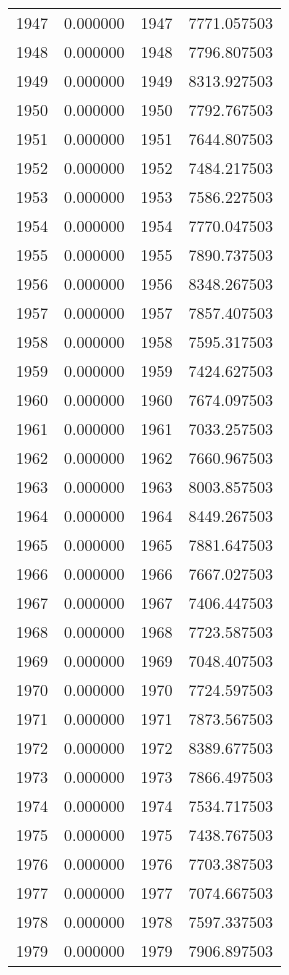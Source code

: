 \documentclass[12pt]{article}
\begin{document}
\begin{longtable}{@{}cccc@{}}
1947 & 0.000000 & 1947 & 7771.057503 \\
1948 & 0.000000 & 1948 & 7796.807503 \\
1949 & 0.000000 & 1949 & 8313.927503 \\
1950 & 0.000000 & 1950 & 7792.767503 \\
1951 & 0.000000 & 1951 & 7644.807503 \\
1952 & 0.000000 & 1952 & 7484.217503 \\
1953 & 0.000000 & 1953 & 7586.227503 \\
1954 & 0.000000 & 1954 & 7770.047503 \\
1955 & 0.000000 & 1955 & 7890.737503 \\
1956 & 0.000000 & 1956 & 8348.267503 \\
1957 & 0.000000 & 1957 & 7857.407503 \\
1958 & 0.000000 & 1958 & 7595.317503 \\
1959 & 0.000000 & 1959 & 7424.627503 \\
1960 & 0.000000 & 1960 & 7674.097503 \\
1961 & 0.000000 & 1961 & 7033.257503 \\
1962 & 0.000000 & 1962 & 7660.967503 \\
1963 & 0.000000 & 1963 & 8003.857503 \\
1964 & 0.000000 & 1964 & 8449.267503 \\
1965 & 0.000000 & 1965 & 7881.647503 \\
1966 & 0.000000 & 1966 & 7667.027503 \\
1967 & 0.000000 & 1967 & 7406.447503 \\
1968 & 0.000000 & 1968 & 7723.587503 \\
1969 & 0.000000 & 1969 & 7048.407503 \\
1970 & 0.000000 & 1970 & 7724.597503 \\
1971 & 0.000000 & 1971 & 7873.567503 \\
1972 & 0.000000 & 1972 & 8389.677503 \\
1973 & 0.000000 & 1973 & 7866.497503 \\
1974 & 0.000000 & 1974 & 7534.717503 \\
1975 & 0.000000 & 1975 & 7438.767503 \\
1976 & 0.000000 & 1976 & 7703.387503 \\
1977 & 0.000000 & 1977 & 7074.667503 \\
1978 & 0.000000 & 1978 & 7597.337503 \\
1979 & 0.000000 & 1979 & 7906.897503 \\

\end{longtable}
\end{document}

